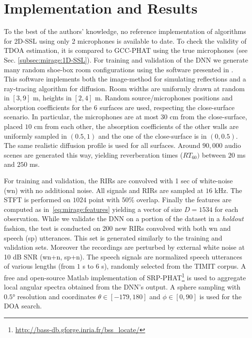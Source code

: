 \section{Implementation and Results}\label{sec:mirage:exp}
To the best of the authors' knowledge, no reference implementation of algorithms
for 2D-SSL using only 2 microphones is available to date.
To check the validity of TDOA estimation, it is compared to GCC-PHAT using
the true microphones (see Sec. \cref{subsec:mirage:1D-SSL}).
For training and validation of the DNN we generate many random
shoe-box room configurations using the software presented in \cite{Schimmel2009}.
This software implements both the image-method for simulating reflections and
a ray-tracing algorithm for diffusion.
Room widths are uniformly drawn at random in $[3, 9]$ m, heights in $[2, 4]$ m.
Random source/microphones positions and absorption coefficients for the 6 surfaces are used,
respecting the close-surface scenario. In particular, the microphones are at most $30$ cm from the close-surface,
placed $10$ cm from each other, the absorption coefficients of the other walls are
uniformly sampled in $(0.5, 1)$ and the one of the close-surface is in $(0, 0.5)$.
The same realistic diffusion profile \cite{gaultier2017vast} is used for all surfaces.
Around $90,000$ audio scenes are generated this way, yielding reverberation times ($RT_{60})$ between $20$ ms and $250$ ms.

For training and validation, the RIRs are convolved with 1 sec of white-noise (wn) with no additional noise.
All signals and RIRs are sampled at $16$ kHz. The STFT is performed on $1024$ point with $50\%$ overlap.
Finally the features are computed as in~\eqref{eq:mirage:features} yielding a vector of size $D = 1534$ for each observation.
While we validate the DNN on a portion of the dataset in a \textit{holdout} fashion, the test is conducted on 200 new RIRs convolved with both wn and speech (sp) utterances.
This set is generated similarly to the training and validation sets. Moreover the recordings are perturbed by external white noise at 10 dB SNR (wn+n, sp+n).
The speech signals are normalized speech utterances of various lengths (from $1$ s to $6$ s), randomly selected from the TIMIT corpus.
A free and open-source Matlab implementation of SRP-PHAT\footnote{\url{http://bass-db.gforge.inria.fr/bss_locate/}} is used to aggregate local angular spectra obtained from the DNN's output.
A sphere sampling with $\ang{0.5}$ resolution and coordinates $\theta \in [-179, 180]$ and $\phi \in [0, 90]$ is used for the DOA search.

